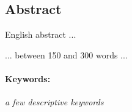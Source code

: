 \subsection*{Abstract}
English abstract ...

... between 150 and 300 words ...

\paragraph{Keywords:}
\textit{a few descriptive keywords}

